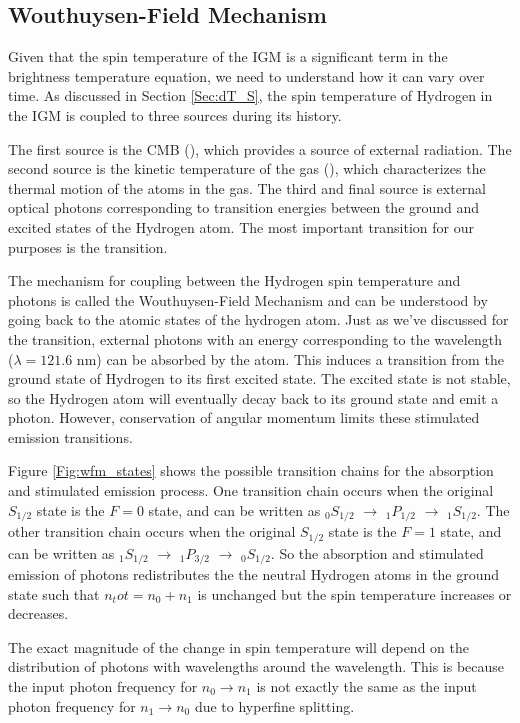 \subsection{Wouthuysen-Field Mechanism}\label{Sec:WFM}

Given that the spin temperature of the IGM is a significant term in the brightness temperature equation, we need to understand how it can vary over time. As discussed in Section \ref{Sec:dT_S}, the spin temperature of Hydrogen in the IGM is coupled to three sources during its history. 

The first source is the CMB (\tg), which provides a source of external \cm radiation. The second source is the kinetic temperature of the gas (\tk), which characterizes the thermal motion of the atoms in the gas. The third and final source is external optical photons corresponding to transition energies between the ground and excited states of the Hydrogen atom. The most important transition for our purposes is the \lya transition. 

The mechanism for coupling between the Hydrogen spin temperature and \lya  photons is called the Wouthuysen-Field Mechanism \cite{wouthuysen_1952}\cite{field_1958} and can be understood by going back to the atomic states of the hydrogen atom. Just as we've discussed for the \cm transition, external photons with an energy corresponding to the \lya  wavelength ($\lambda = 121.6$ nm) can be absorbed by the atom. This induces a transition from the ground state of Hydrogen to its first excited state. The excited state is not stable, so the Hydrogen atom will eventually decay back to its ground state and emit a photon. However, conservation of angular momentum limits these stimulated emission transitions. 

Figure \ref{Fig:wfm_states} shows the possible transition chains for the \lya absorption and stimulated emission process. One transition chain occurs when the original $S_{1/2}$ state is the $F=0$ state, and can be written as $_0S_{1/2}$ $\rightarrow$ $_1P_{1/2}$ $\rightarrow$ $_1S_{1/2}$. The other transition chain occurs when the original $S_{1/2}$ state is the $F=1$ state, and can be written as $_1S_{1/2}$ $\rightarrow$ $_1P_{3/2}$ $\rightarrow$ $_0S_{1/2}$. So the absorption and stimulated emission of \lya photons redistributes the the neutral Hydrogen atoms in the ground state such that $n_tot = n_0 + n_1$ is unchanged but the spin temperature increases or decreases. 

The exact magnitude of the change in spin temperature will depend on the distribution of photons with wavelengths around the \lya wavelength. This is because the input photon frequency for $n_0 \rightarrow n_1$ is not exactly the same as the input photon frequency for $n_1 \rightarrow n_0$ due to hyperfine splitting. 

